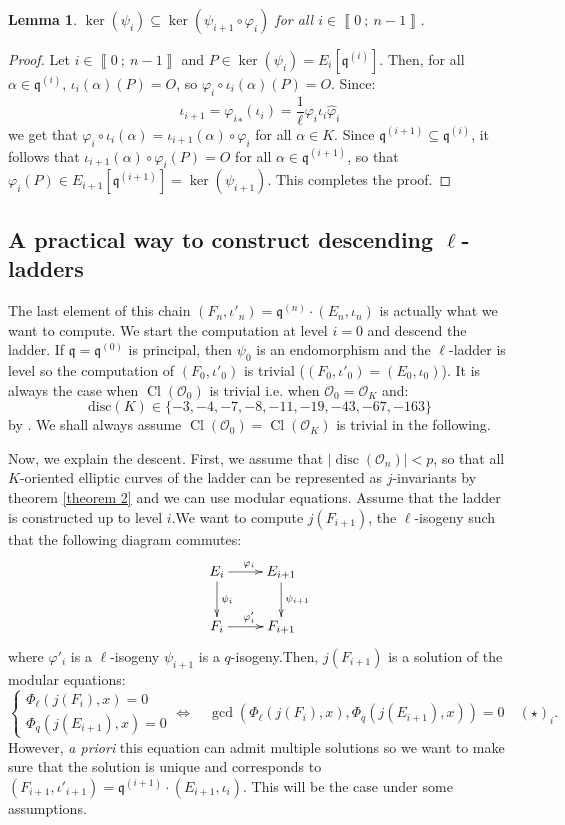 \documentclass[a4paper,10pt,notitlepage]{report}
\theoremstyle{definition}
\theoremstyle{plain}
\newtheorem{Lemma}[Definition]{Lemma}
\theoremstyle{definition}
\newcommand{\mO}{\mathcal{O}}
\renewcommand{\i}[2]{\left\llbracket #1~;~#2\right\rrbracket}
\renewcommand{\(}{\left(}
\renewcommand{\)}{\right)}
\newcommand{\mf}[1]{\mathfrak{#1}}
\newcommand{\mfq}{\mathfrak{q}}
\DeclareMathOperator{\disc}{disc}
\DeclareMathOperator{\Cl}{Cl}
\begin{document}
\begin{Lemma}
$\ker(\psi_i)\subseteq\ker(\psi_{i+1}\circ\varphi_i)$ for all $i\in\i{0}{n-1}$.  
\end{Lemma}

\begin{proof}
Let $i\in\i{0}{n-1}$ and $P\in \ker(\psi_i)=E_i[\mfq^{(i)}]$. Then, for all $\alpha\in\mfq^{(i)}$, $\iota_i(\alpha)(P)=O$, so $\varphi_i\circ\iota_i(\alpha)(P)=O$. Since:
\[\iota_{i+1}={\varphi_i}_*(\iota_i)=\frac{1}{\ell}\varphi_i\iota_i\widehat{\varphi}_i\]
we get that $\varphi_i\circ\iota_i(\alpha)=\iota_{i+1}(\alpha)\circ\varphi_i$ for all $\alpha\in K$. Since $\mfq^{(i+1)}\subseteq\mfq^{(i)}$, it follows that $\iota_{i+1}(\alpha)\circ\varphi_i(P)=O$ for all $\alpha\in\mfq^{(i+1)}$, so that $\varphi_i(P)\in E_{i+1}[\mfq^{(i+1)}]=\ker(\psi_{i+1})$. This completes the proof.
\end{proof} 

\subsection{A practical way to construct descending $\ell$-ladders}\label{Paragraph 1}

The last element of this chain $(F_n,\iota'_n)=\mfq^{(n)}\cdot(E_n,\iota_n)$ is actually what we  want to compute. We start the computation at level $i=0$ and descend the ladder. If $\mfq=\mfq^{(0)}$ is principal, then $\psi_0$ is an endomorphism and the $\ell$-ladder is level so the computation of $(F_0,\iota'_0)$ is trivial ($(F_0,\iota'_0)=(E_0,\iota_0)$). It is always the case when $\Cl(\mO_0)$ is trivial i.e. when $\mO_0=\mO_K$ and:
\[\mbox{disc}(K)\in\{-3,-4,-7,-8,-11,-19,-43,-67,-163\}\]
by \cite[theorem 7.30.(i)]{Cox}.  We shall always assume $\Cl(\mO_0)=\Cl(\mO_K)$ is trivial in the following.

Now, we explain the descent. First, we assume that $|\disc(\mO_n)|<p$, so that all $K$-oriented elliptic curves of the ladder can be represented as $j$-invariants by theorem \ref{theorem 2} and we can use modular equations. Assume that the ladder is constructed up to level $i$.We want to compute $j(F_{i+1})$, the $\ell$-isogeny  such that the following diagram commutes:
\[\xymatrix{
E_i \ar[d]^{\psi_i} \ar[r]^{\varphi_i} & E_{i+1}\ar[d]^{\psi_{i+1}} \\
F_i \ar[r]^{\varphi'_i} & F_{i+1}
}\]
where $\varphi'_i$ is a $\ell$-isogeny $\psi_{i+1}$ is a $q$-isogeny.Then, $j(F_{i+1})$ is a solution of the modular equations:
\[\left\{\begin{array}{c}
\Phi_\ell(j(F_i),x)=0\\
\Phi_q(j(E_{i+1}),x)=0
\end{array}\right. \Longleftrightarrow \quad \gcd(\Phi_\ell(j(F_i),x),\Phi_q(j(E_{i+1}),x))=0\quad (\star)_i.\]
However, \emph{a priori} this equation can admit multiple solutions so we want to make sure that the solution is unique and corresponds to $(F_{i+1},\iota'_{i+1})=\mf{q}^{(i+1)}\cdot(E_{i+1},\iota_i)$. This will be the case under some assumptions.
\end{document}
